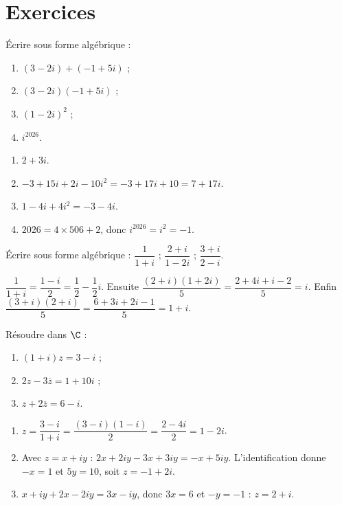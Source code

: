 \mxnewpage
\section{Exercices}
\begin{exercise}
Écrire sous forme algébrique :
\begin{enumerate}
\item $(3-2i)+(-1+5i)$ ;
\item $(3-2i)(-1+5i)$ ;
\item $(1-2i)^2$ ;
\item $i^{2026}$.
\end{enumerate}
\end{exercise}
\begin{solution}
\begin{enumerate}
\item $2+3i$.
\item $-3+15i+2i-10i^2=-3+17i+10=7+17i$.
\item $1-4i+4i^2=-3-4i$.
\item $\num{2026}=4\times506+2$, donc $i^{2026}=i^2=-1$.
\end{enumerate}
\end{solution}

\begin{exercise}
Écrire sous forme algébrique : $\dfrac1{1+i}$ ; $\dfrac{2+i}{1-2i}$ ; $\dfrac{3+i}{2-i}$.
\end{exercise}
\begin{solution}
$\dfrac1{1+i}=\dfrac{1-i}{2}=\dfrac12-\dfrac12i$. Ensuite $\dfrac{(2+i)(1+2i)}{5}=\dfrac{2+4i+i-2}{5}=i$. Enfin $\dfrac{(3+i)(2+i)}{5}=\dfrac{6+3i+2i-1}{5}=1+i$.
\end{solution}

\begin{exercise}[Équations]
Résoudre dans $\C$ :
\begin{enumerate}
\item $(1+i)z=3-i$ ;
\item $2z-3\overline z=1+10i$ ;
\item $z+2\overline z=6-i$.
\end{enumerate}
\end{exercise}
\begin{solution}
\begin{enumerate}
\item $z=\dfrac{3-i}{1+i}=\dfrac{(3-i)(1-i)}{2}=\dfrac{2-4i}{2}=1-2i$.
\item Avec $z=x+iy$ : $2x+2iy-3x+3iy=-x+5iy$. L'identification donne $-x=1$ et $5y=10$, soit $z=-1+2i$.
\item $x+iy+2x-2iy=3x-iy$, donc $3x=6$ et $-y=-1$ : $z=2+i$.
\end{enumerate}
\end{solution}

